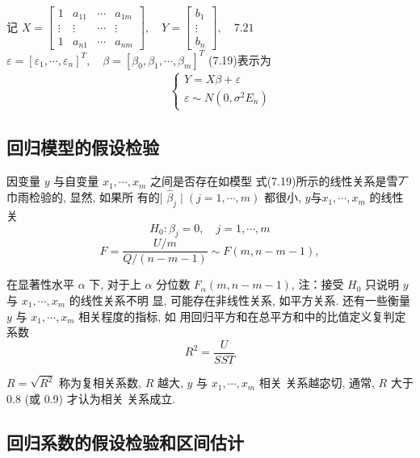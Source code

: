 记 \( X=\left[\begin{array}{cccc}1 & a_{11} & \cdots & a_{1 m} \\ \vdots & \vdots & \cdots & \vdots \\ 1 & a_{n 1} & \cdots & a_{n m}\end{array}\right], \quad Y=\left[\begin{array}{c}b_{1} \\ \vdots \\ b_{n}\end{array}\right], \quad {7 . 2 1} \)
\( \varepsilon=\left[\varepsilon_{1}, \cdots, \varepsilon_{n}\right]^{T}, \quad \beta=\left[\beta_{0}, \beta_{1}, \cdots, \beta_{m}\right]^{T} \)
(7.19)表示为
$$
\begin{array}{l}

\qquad\left\{\begin{array}{l}
{Y}={X} {\beta}+{\varepsilon} \\
{\varepsilon} \sim {N}\left({0}, \sigma^{2} {E}_{n}\right)
\end{array}\right.
\end{array}
$$

\subsection{回归模型的假设检验}

因变量 \( y \) 与自变量 \( x_{1}, \cdots, x_{m} \) 之间是否存在如模型 式(7.19)所示的线性关系是雪丆巾雨检验的, 显然, 如果所 有的| \( \hat{\beta}_{j} \mid(j=1, \cdots, m) \) 都很小, \( y 与 x_{1}, \cdots, x_{m} \) 的线性关
$$
H_{0}: \beta_{j}=0, \quad j=1, \cdots, m
$$
$$
F=\frac{U / m}{Q /(n-m-1)} \sim F(m, n-m-1),
$$

在显著性水平 \( \alpha \) 下, 对于上 \( \alpha \) 分位数 \( {F}_{\alpha}({m}, {n}-{m}-{1}) \),
注：接受 \( {H}_{0} \) 只说明 \( {y} \) 与 \( {x}_{1}, \cdots, {x}_{m} \) 的线性关系不明
显, 可能存在非线性关系, 如平方关系.  还有一些衡量 \( y \) 与 \( x_{1}, \cdots, x_{m} \) 相关程度的指标, 如 用回归平方和在总平方和中的比值定义复判定系数
$$
{R}^{2}=\frac{{U}}{{S S T}}
$$

\( {R}=\sqrt{{R}^{2}} \) 称为复相关系数, \( {R} \) 越大, \( {y} \) 与 \( {x}_{1}, \cdots, {x}_{m} \) 相关
关系越宓切, 通常,  \( {R} \) 大于 \( 0.8 \) (或 0.9) 才认为相关
关系成立. 

\subsection{回归系数的假设检验和区间估计}

